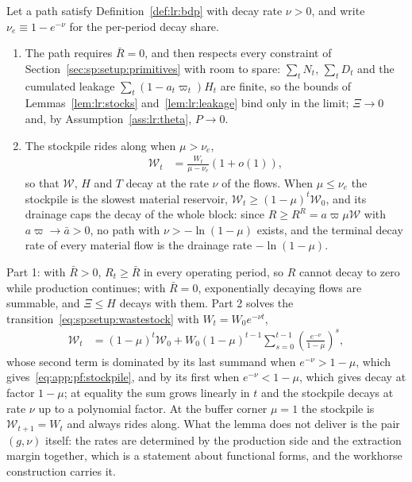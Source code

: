 \begin{lemma}\label{lem:app:pf:bdp}
Let a path satisfy Definition~\ref{def:lr:bdp} with decay rate $\nu>0$, and write $\nu_e\equiv1-e^{-\nu}$ for the per-period decay share.
\begin{enumerate}
\item The path requires $\bar R=0$, and then respects every constraint of Section~\ref{sec:sp:setup:primitives} with room to spare: $\sum_tN_t$, $\sum_tD_t$ and the cumulated leakage $\sum_t\left(1-a_t\varpi_t\right)H_t$ are finite, so the bounds of Lemmas~\ref{lem:lr:stocks} and~\ref{lem:lr:leakage} bind only in the limit; $\Xi\to0$ and, by Assumption~\ref{ass:lr:theta}, $P\to0$.
\item The stockpile rides along when $\mu>\nu_e$,
\begin{align}
\mathcal W_t &= \frac{W_t}{\mu-\nu_e}\left(1+o\left(1\right)\right),
\label{eq:app:pf:stockpile}
\end{align}
so that $\mathcal W$, $H$ and $T$ decay at the rate $\nu$ of the flows. When $\mu\le\nu_e$ the stockpile is the slowest material reservoir, $\mathcal W_t\ge\left(1-\mu\right)^t\mathcal W_0$, and its drainage caps the decay of the whole block: since $R\ge R^R=a\varpi\mu\mathcal W$ with $a\varpi\to\bar a>0$, no path with $\nu>-\ln\left(1-\mu\right)$ exists, and the terminal decay rate of every material flow is the drainage rate $-\ln\left(1-\mu\right)$.
\end{enumerate}
\end{lemma}

Part 1: with $\bar R>0$, $R_t\ge\bar R$ in every operating period, so $R$ cannot decay to zero while production continues; with $\bar R=0$, exponentially decaying flows are summable, and $\Xi\le H$ decays with them. Part 2 solves the transition~\eqref{eq:sp:setup:wastestock} with $W_t=W_0e^{-\nu t}$,
\begin{align}
\mathcal W_t &= \left(1-\mu\right)^t\mathcal W_0+W_0\left(1-\mu\right)^{t-1}\sum_{s=0}^{t-1}\left(\frac{e^{-\nu}}{1-\mu}\right)^{s},
\label{eq:app:pf:stockpile-sum}
\end{align}
whose second term is dominated by its last summand when $e^{-\nu}>1-\mu$, which gives~\eqref{eq:app:pf:stockpile}, and by its first when $e^{-\nu}<1-\mu$, which gives decay at factor $1-\mu$; at equality the sum grows linearly in $t$ and the stockpile decays at rate $\nu$ up to a polynomial factor. At the buffer corner $\mu=1$ the stockpile is $\mathcal W_{t+1}=W_t$ and always rides along. What the lemma does not deliver is the pair $\left(g,\nu\right)$ itself: the rates are determined by the production side and the extraction margin together, which is a statement about functional forms, and the workhorse construction carries it.


